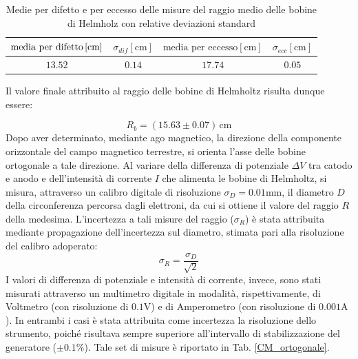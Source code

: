 \documentclass[]{article}
\begin{document}
    \begin{table}[H]
        \centering
    
        \begin{tabular} {||c|c||c|c||}
            \hline
            $ \text{media per difetto\,} [\text{cm}] $ & $\sigma_{dif} [\text{cm}] $ & $ \text{media per eccesso} [\text{cm}] $ & $\sigma_{ecc} [\text{cm}] $\\
            \hline \hline
    
            $ 13.52 $ & $ 0.14 $ & $ 17.74 $ & $ 0.05 $ \\\hline
    
        \end{tabular}
        \caption{Medie per difetto e per eccesso delle misure del raggio medio delle bobine di Helmholz con relative deviazioni standard}
        \label{media_devst_Rb}
    
    \end{table}
    Il valore finale attribuito al raggio delle bobine di Helmholtz risulta dunque essere:

    \begin{equation}
        \label{misura_Rb}
        R_b = (15.63 \pm 0.07) \, \text{cm}
    \end{equation} 
    Dopo aver determinato, mediante ago magnetico, la direzione della componente orizzontale del campo magnetico terrestre, si orienta l'asse delle bobine ortogonale a tale direzione. Al variare della differenza di potenziale $\Delta V $ tra catodo e anodo e dell'intensità di corrente $I$ che alimenta le bobine di Helmholtz, si misura, attraverso un calibro digitale di risoluzione $\sigma_{D}= 0.01 \text{mm}$, il diametro $D$ della circonferenza percorsa dagli elettroni, da cui si ottiene il valore del raggio $R$ della medesima. L'incertezza a tali misure del raggio ($\sigma_{R}$) è stata attribuita mediante propagazione dell'incertezza sul diametro, stimata pari alla risoluzione del calibro adoperato: 
    \begin{equation}
        \label{sigma_raggioCirc}
        \sigma_{R} = \frac{\sigma_{D}}{\sqrt{2} }
    \end{equation}
    I valori di differenza di potenziale e intensità di corrente, invece, sono stati misurati attraverso un multimetro digitale in modalità, rispettivamente, di Voltmetro (con risoluzione di $0.1 \text{V}$) e di Amperometro (con risoluzione di $0.001 \text{A}$). In entrambi i casi è stata attribuita come incertezza la risoluzione dello strumento, poiché risultava sempre superiore all'intervallo di stabilizzazione del generatore ($\pm 0.1 \%$). Tale set di misure è riportato in Tab. \ref{CM_ortogonale}. \\
    
\end{document}
